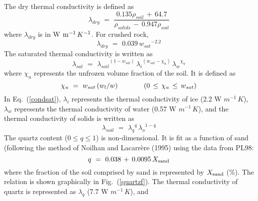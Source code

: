 The dry thermal conductivity is defined as
%
\begin{equation}
\label{conddry}
\lambda_{dry} \,\,=\,\, 
\frac{0.135 \rho_{soil} \,+\,64.7}
{\rho_{solids} \,-\,0.947 \rho_{soil}}
\end{equation}
%
where $\lambda_{dry}$ is in W ${\rm m^{-1}}\, K^{-1}$.
%
For crushed rock, 
%
%
\begin{equation}
\lambda_{dry} \,\,=\,\, 0.039 \, {w_{sat}}^{-2.2}
\end{equation}
%
The saturated thermal conductivity is written as
%
\begin{equation}\label{condsat}
\lambda_{sat} \,\,=\,\, 
{\lambda_{soil}}^{(1-w_{sat})}\,
{\lambda_{i}}^{(w_{sat}-\chi_u)}\,
{\lambda_{w}}^{\chi_u}
\end{equation}
%
where $\chi_u$ represents the unfrozen volume fraction of the soil.
It is defined as
%
%
\begin{equation}
\chi_u \,\,=\,\,w_{sat}\left(w_l/w\right)
\hskip.5in
\left(0 \,\leq\,\chi_u \,\leq\,w_{sat}\right)
\end{equation}
%
%
In Eq.~(\ref{condsat}),
$\lambda_{i}$ represents the thermal conductivity of ice
(2.2 W ${m^{-1}\,K}$), $\lambda_{w}$ represents the thermal 
conductivity of water
(0.57 W ${m^{-1}\,K}$), and
the thermal conductivity of solids is written as
%
%
\begin{equation}
\label{condsolids}
\lambda_{soil} \,\,=\,\, {\lambda_q}^q \,{\lambda_o}^{1-q}
\end{equation}
%
%
The quartz content ($0 \leq q \leq 1$) is non-dimensional.
It is fit as a function of sand (following the method of
Noilhan and Lacarr\`{e}re (1995)\nocite{Noilhan1995}
using the data from PL98:
%
\begin{equation}\label{quartzr}
q \,\,=\,\, 0.038 \,+\, 0.0095 \,X_{\rm sand} 
\end{equation}
%
where the fraction of the soil comprised by sand
is represented by $X_{\rm sand}$ (\%). The relation is
shown graphically in Fig.~(\ref{quartzf}).
The thermal conductivity of quartz is represented as
$\lambda_q$ (7.7 W ${m^{-1}\,K}$), and 
